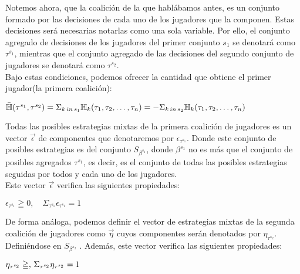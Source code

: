 \documentclass[10pt,a4paper]{book}
\begin{document}
Notemos ahora, que la coalición de la que hablábamos antes, es un conjunto formado por las decisiones de cada uno de los jugadores que la componen. Estas decisiones será necesarias notarlas como una sola variable. Por ello, el conjunto agregado de decisiones de los jugadores del primer conjunto $s_1$ se denotará como $\tau^{s_1}$, mientras que el conjunto agregado de las decisiones del segundo conjunto de jugadores se denotará como $\tau^{s_2}$.\\

Bajo estas condiciones, podemos ofrecer la cantidad que obtiene el primer jugador(la primera coalición):\\

\begin{center}

$ \bar{\mathbb{H}}(\tau^{s_1},\tau^{s_2})=\Sigma_{k \thinspace in \thinspace  s_1} \mathbb{H}_k(\tau_1,\tau_2, \ldots, \tau_n) = - \Sigma_{k \thinspace in \thinspace s_2} \mathbb{H}_k(\tau_1,\tau_2, \ldots, \tau_n)$

\end{center}

Todas las posibles estrategias mixtas de la primera coalición de jugadores es un vector $\overrightarrow{\epsilon}$ de componentes que denotaremos por $\epsilon_{\tau^{s_1}}$. Donde este conjunto de posibles estrategias es del conjunto $S_{\beta^{s_1}}$, donde $\beta^{s_1}$ no es más que el conjunto de posibles agregados $\tau^{s_1}$, es decir, es el conjunto de todas las posibles estrategias seguidas por todos y cada uno de los jugadores.\\

Este vector $\overrightarrow{\epsilon}$ verifica las siguientes propiedades:\\

\begin{center}

$ \epsilon_{\tau^{s_1}} \geqq 0, \quad \Sigma_{\tau^{s_1}}\epsilon_{\tau^{s_1}}=1$

\end{center}

De forma análoga, podemos definir el vector de estrategias mixtas de la segunda coalición de jugadores como $\overrightarrow{\eta}$ cuyos componentes serán denotados por $\eta_{\tau^{s_2}}$. Definiéndose en  $S_{\beta^{s_2}}$ . Además, este vector verifica las siguientes propiedades:\\

\begin{center}

$\eta_{\tau^{s_2}} \geqq, \thinspace \Sigma_{\tau^{s_2}}\eta_{\tau^{s_2}}=1$

\end{center}
\end{document}
